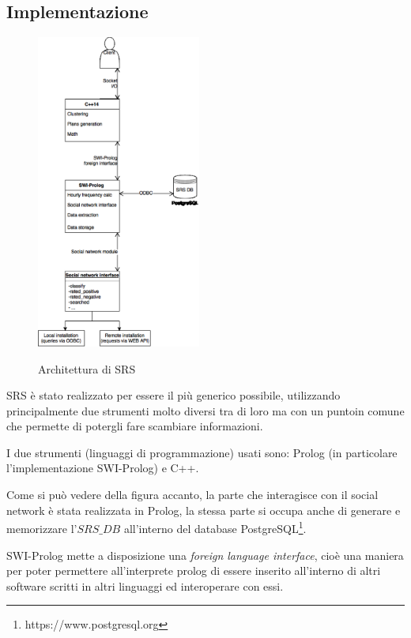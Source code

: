 {\subsection{Implementazione}
\begin{figure}
    \vspace{-20pt}
    \begin{center}
        \includegraphics[width=0.48\textwidth]{images/arch.eps}
        \label{fig:arch}
    \end{center}
    \caption{Architettura di SRS}
    \vspace{-20pt}
\end{figure}

SRS è stato realizzato per essere il più generico possibile, utilizzando principalmente due strumenti molto diversi tra di loro ma con un puntoin comune che permette di potergli fare scambiare informazioni.

I due strumenti (linguaggi di programmazione) usati sono: Prolog (in particolare l'implementazione SWI-Prolog) e C++.

Come si può vedere della figura accanto, la parte che interagisce con il social network è stata realizzata in Prolog, la stessa parte si occupa anche di generare e memorizzare l'$SRS\_DB$ all'interno del database PostgreSQL\footnote{https://www.postgresql.org}.

SWI-Prolog mette a disposizione una \textit{foreign language interface}, cioè una maniera per poter permettere all'interprete prolog di essere inserito all'interno di altri software scritti in altri linguaggi ed interoperare con essi.

}
